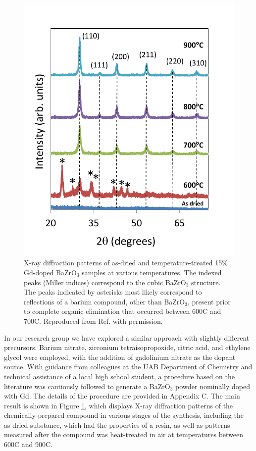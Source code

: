 \begin{figure}
    \centering
    \includegraphics[scale=.8]{Figures/XRD_UAB_Chemical_Method.pdf}
    \caption{X-ray diffraction patterns of as-dried and temperature-treated 15\% Gd-doped BaZrO$_3$ samples at various temperatures. The indexed peaks (Miller indices) correspond to the cubic BaZrO$_3$ structure. The peaks indicated by asterisks most likely correspond to reflections of a barium compound, other than BaZrO$_3$, present prior to complete organic elimination that occurred between 600\textdegree C and 700\textdegree C. Reproduced from Ref. \cite{GCamata2015} with permission.}
    \label{fig:XRD:UAB:Chemical}
\end{figure}

In our research group we have explored a similar approach with slightly different precursors. Barium nitrate, zirconium tetraisopropoxide, citric acid, and ethylene glycol were employed, with the addition of gadolinium nitrate as the dopant source. With guidance from colleagues at the UAB Department of Chemistry and technical assistance of a local high school student, a procedure based on the literature was cautiously followed to generate a BaZrO$_3$ powder nominally doped with Gd. The details of the procedure are provided in Appendix C. The main result is shown in Figure \ref{fig:XRD:UAB:Chemical}, which displays X-ray diffraction patterns of the chemically-prepared compound in various stages of the synthesis, including the as-dried substance, which had the properties of a resin, as well as patterns measured after the compound was heat-treated in air at temperatures between 600\textdegree C and 900\textdegree C. 

